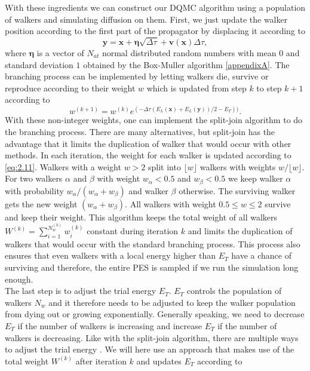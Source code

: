 \documentclass [12pt]{report}
\begin{document}
With these ingredients we can construct our DQMC algorithm using a population of walkers and simulating diffusion on them. First, we just update the walker position according to the first part of the propagator by displacing it according to
\begin{equation}\label{eq:2.10}
\bm{y} = \bm{x} + \bm{\eta}\sqrt{\Delta \tau} + \bm{v}(\bm{x})\Delta \tau,
\end{equation}
where $\bm{\eta}$ is a vector of $N_{at}$ normal distributed random numbers with mean $0$ and standard deviation $1$ obtained by the Box-Muller algorithm \ref{appendixA}.
The branching process can be implemented by letting walkers die, survive or reproduce according to their weight $w$ which is updated from step $k$ to step $k+1$ according to 
\begin{equation}\label{eq:2.11} 
w^{(k+1)} = w^{(k)} e^{(-\Delta \tau (E_L(\bm{x}) + E_L(\bm{y}))/2 - E_T))}.
\end{equation}
With these non-integer weights, one can implement the split-join algorithm \cite{split_join} to do the branching process. There are many alternatives, but split-join has the advantage that it limits the duplication of walker that would occur with other methods.
 In each iteration, the weight for each walker is updated according to \eqref{eq:2.11}. Walkers with a weight $w > 2$ split into $\lfloor w \rfloor$ walkers with weights $w/\lfloor w \rfloor$. For two walkers $\alpha$ and $\beta$ with weight $w_\alpha < 0.5$ and $w_\beta < 0.5$ we keep walker $\alpha$  with probability $w_\alpha/(w_\alpha + w_\beta)$ and walker $\beta$ otherwise. The surviving walker gets the new weight $(w_\alpha + w_\beta)$. All walkers with weight $0.5 \leq w \leq 2$ survive and keep their weight. This algorithm keeps the total weight of all walkers $W^{(k)} =  \sum_{i = 1}^{N_w^{(k)}} w_i^{(k)}$ constant during iteration $k$ and limits the duplication of walkers that would occur with the standard branching process.
 This process also ensures that even walkers with a local energy higher than $E_T$ have a chance of surviving and therefore, the entire PES is sampled if we run the simulation long enough. \\
The last step is to adjust the trial energy $E_T$. $E_T$ controls the population of walkers $N_w$ and it therefore needs to be adjusted to keep the walker population from dying out or growing exponentially. Generally speaking, we need to decrease $E_T$ if the number of walkers is increasing and increase $E_T$ if the number of walkers is decreasing.  Like with the split-join algorithm, there are multiple ways to adjust the trial energy \cite{mccoy,alavi}. We will here use an approach \cite{cyrus} that makes use of the total weight $W^{(k)}$ after iteration $k$ and updates $E_T$ according to
\end{document}
